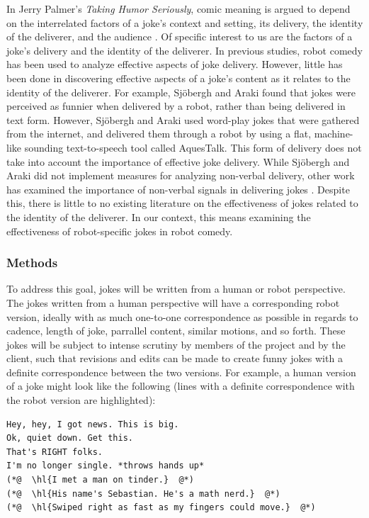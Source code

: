 \documentclass[onecolumn, draftclsnofoot,10pt, compsoc]{IEEEtran}
\begin{document}
In Jerry Palmer's \textit{Taking Humor Seriously}, comic meaning is argued to depend on the interrelated factors of a joke's context and setting, its delivery, the identity of the deliverer, and the audience \cite{Palmer:1993}.
Of specific interest to us are the factors of a joke's delivery and the identity of the deliverer.
In previous studies, robot comedy has been used to analyze effective aspects of joke delivery.
However, little has been done in discovering effective aspects of a joke's content as it relates to the identity of the deliverer.
For example, Sj\"{o}bergh and Araki \cite{RobotsMakeThings:2008} found that jokes were perceived as funnier when delivered by a robot, rather than being delivered in text form.
However, Sj\"{o}bergh and Araki used word-play jokes that were gathered from the internet, and delivered them through a robot by using a flat, machine-like sounding text-to-speech tool called AquesTalk. This form of delivery does not take into account the importance of effective joke delivery. While Sj\"{o}bergh and Araki did not implement measures for analyzing non-verbal delivery, other work has examined the importance of non-verbal signals in delivering jokes \cite{KatevasRobot:2014} \cite{KnightEightLessons:2011}.
Despite this, there is little to no existing literature on the effectiveness of jokes related to the identity of the deliverer.
In our context, this means examining the effectiveness of robot-specific jokes in robot comedy.

\subsubsection{Methods}
To address this goal, jokes will be written from a human or robot perspective.
The jokes written from a human perspective will have a corresponding robot version, ideally with as much one-to-one correspondence as possible in regards to cadence, length of joke, parrallel content, similar motions, and so forth.
These jokes will be subject to intense scrutiny by members of the project and by the client, such that revisions and edits can be made to create funny jokes with a definite correspondence between the two versions.
For example, a human version of a joke might look like the following (lines with a definite correspondence with the robot version are highlighted):

\begin{lstlisting}
Hey, hey, I got news. This is big.
Ok, quiet down. Get this.
That's RIGHT folks.
I'm no longer single. *throws hands up*
(*@  \hl{I met a man on tinder.}  @*)
(*@  \hl{His name's Sebastian. He's a math nerd.}  @*)
(*@  \hl{Swiped right as fast as my fingers could move.}  @*)
\end{lstlisting}
\end{document}
